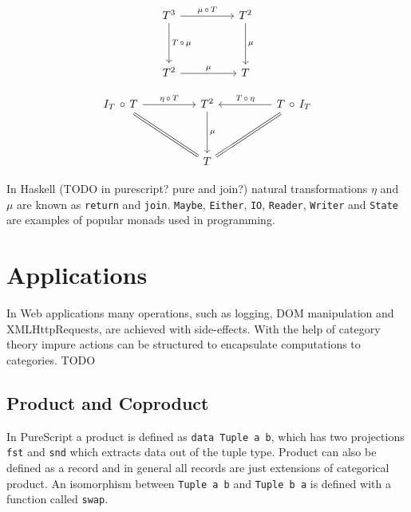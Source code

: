 \documentclass[article]{aaltoseries}
\begin{document}
    \[
      \begin{tikzcd}[row sep=huge, column sep=huge]
        T^3 \arrow[r, "\mu\, \circ\, T"]
        \arrow[d, "T\, \circ\, \mu"]
        & T^2 \arrow[d, "\mu"] \\
        T^2 \arrow[r, "\mu"]
        & T
      \end{tikzcd}
    \]

    \[
      \begin{tikzcd}[row sep=huge, column sep=huge]
        I_T\, \circ\, T
        \arrow[r, "\eta\, \circ\, T"]
        \arrow[dr, equal]
        & T^2
        \arrow[d, "\mu"]
        & T\, \circ\, I_T
        \arrow[l, "T\, \circ\, \eta"{above}]
        \arrow[dl, equal] \\
        {}
        & T
        &
      \end{tikzcd}
    \]

    In Haskell (TODO in purescript? pure and join?) natural transformations $\eta$ and $\mu$ are known as
    \lstinline|return| and \lstinline|join|. \lstinline|Maybe|,
    \lstinline|Either|, \lstinline|IO|, \lstinline|Reader|, \lstinline|Writer|
    and \lstinline|State| are examples of popular monads used in programming.



\section{Applications}

In Web applications many operations, such as logging, DOM manipulation and
XMLHttpRequests, are achieved with side-effects. With the help of category
theory impure actions can be structured to encapsulate computations to
categories. TODO

  \subsection{Product and Coproduct}
    In PureScript a product is defined as \lstinline|data Tuple a b|, which has
    two projections \lstinline|fst| and \lstinline|snd| which extracts data out
    of the tuple type. Product can also be defined as a record and in general
    all records are just extensions of categorical product. An isomorphism
    between \lstinline|Tuple a b| and \lstinline|Tuple b a| is defined with a
    function called \lstinline|swap|.
    
\end{document}
